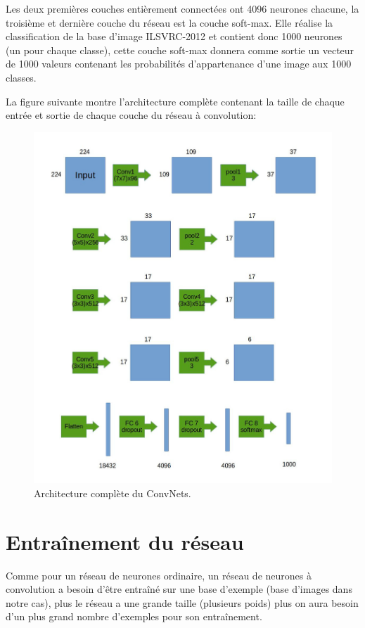 Les deux premières couches entièrement connectées ont 4096 neurones chacune, la troisième et dernière couche du réseau est la couche soft-max. Elle réalise la classification de la base d'image ILSVRC-2012 et contient donc 1000 neurones (un pour chaque classe), cette couche soft-max donnera comme sortie un vecteur de 1000 valeurs contenant les probabilités d'appartenance d'une image aux 1000 classes.

	La figure suivante montre l'architecture complète contenant la taille de chaque entrée et sortie de chaque couche du réseau à convolution:

\begin{figure}[H]
	\centering
		\includegraphics[width=6in]{Figures/architectureVGG.jpg}
	\caption[An Electron]{Architecture complète du ConvNets.}
	\label{fig:Electron}
\end{figure}



\section{Entraînement du réseau}
	Comme pour un réseau de neurones ordinaire, un réseau de neurones à convolution a besoin d'être entraîné sur une base d'exemple (base d'images dans notre cas), plus le réseau a une grande taille (plusieurs poids) plus on aura besoin d'un plus grand nombre d'exemples pour son entraînement. 
	
